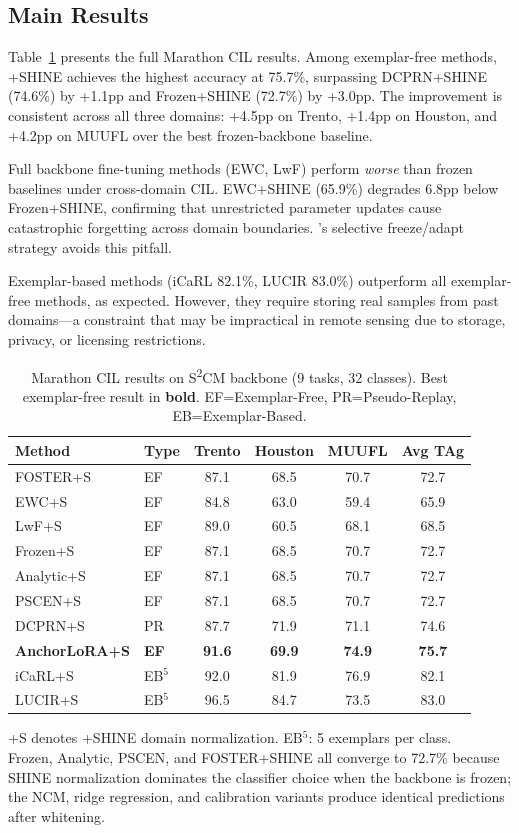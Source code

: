 \subsection{Main Results}

Table~\ref{tab:main} presents the full Marathon CIL results. Among exemplar-free methods, \methodname{}+SHINE achieves the highest accuracy at 75.7\%, surpassing DCPRN+SHINE (74.6\%) by +1.1pp and Frozen+SHINE (72.7\%) by +3.0pp. The improvement is consistent across all three domains: +4.5pp on Trento, +1.4pp on Houston, and +4.2pp on MUUFL over the best frozen-backbone baseline.

Full backbone fine-tuning methods (EWC, LwF) perform \emph{worse} than frozen baselines under cross-domain CIL. EWC+SHINE (65.9\%) degrades 6.8pp below Frozen+SHINE, confirming that unrestricted parameter updates cause catastrophic forgetting across domain boundaries. \methodname{}'s selective freeze/adapt strategy avoids this pitfall.

Exemplar-based methods (iCaRL 82.1\%, LUCIR 83.0\%) outperform all exemplar-free methods, as expected. However, they require storing real samples from past domains---a constraint that may be impractical in remote sensing due to storage, privacy, or licensing restrictions.

\begin{table}[t]
\centering
\caption{Marathon CIL results on S\textsuperscript{2}CM backbone (9 tasks, 32 classes). Best exemplar-free result in \textbf{bold}. EF=Exemplar-Free, PR=Pseudo-Replay, EB=Exemplar-Based.}
\label{tab:main}
\begin{tabular}{llcccc}
\toprule
Method & Type & Trento & Houston & MUUFL & Avg TAg \\
\midrule
FOSTER+S & EF & 87.1 & 68.5 & 70.7 & 72.7 \\
EWC+S & EF & 84.8 & 63.0 & 59.4 & 65.9 \\
LwF+S & EF & 89.0 & 60.5 & 68.1 & 68.5 \\
Frozen+S & EF & 87.1 & 68.5 & 70.7 & 72.7 \\
Analytic+S & EF & 87.1 & 68.5 & 70.7 & 72.7 \\
PSCEN+S & EF & 87.1 & 68.5 & 70.7 & 72.7 \\
DCPRN+S & PR & 87.7 & 71.9 & 71.1 & 74.6 \\
\textbf{AnchorLoRA+S} & \textbf{EF} & \textbf{91.6} & \textbf{69.9} & \textbf{74.9} & \textbf{75.7} \\
\midrule
iCaRL+S & EB$^{5}$ & 92.0 & 81.9 & 76.9 & 82.1 \\
LUCIR+S & EB$^{5}$ & 96.5 & 84.7 & 73.5 & 83.0 \\
\bottomrule
\end{tabular}
\vspace{-1mm}
{\footnotesize +S denotes +SHINE domain normalization. EB$^5$: 5 exemplars per class.\\
Frozen, Analytic, PSCEN, and FOSTER+SHINE all converge to 72.7\% because SHINE normalization dominates the classifier choice when the backbone is frozen; the NCM, ridge regression, and calibration variants produce identical predictions after whitening.}
\end{table}

